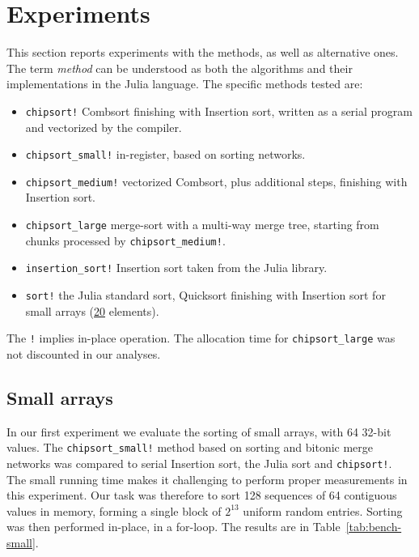 \documentclass{juliacon}
\begin{document}
\section{Experiments}
\label{sec:experiments}
%
This section reports experiments with the \chipsort methods, as well as alternative ones. The term {\it method} can be understood as both the algorithms and their implementations in the Julia language. The specific methods tested are:
\begin{itemize}
\item {\tt chipsort!} Combsort finishing with Insertion sort, written as a serial program and vectorized by the compiler.
\item {\tt chipsort\_small!} in-register, based on sorting networks.
\item {\tt chipsort\_medium!} vectorized Combsort, plus additional steps, finishing with Insertion sort.
\item {\tt chipsort\_large} merge-sort with a multi-way merge tree, starting from chunks processed by {\tt chipsort\_medium!}.
\item {\tt insertion\_sort!} Insertion sort taken from the Julia library.
\item {\tt sort!} the Julia standard sort, Quicksort finishing with Insertion sort for small arrays (\href{https://github.com/JuliaLang/julia/blob/de3401908a506727ed70b3e953bd721ab4d66109/base/sort.jl#L461}{20} elements).
\end{itemize}

The {\tt !} implies in-place operation. The allocation time for {\tt chipsort\_large} was not discounted in our analyses.

\subsection{Small arrays}
In our first experiment we evaluate the sorting of small arrays, with 64 32-bit values. The {\tt chipsort\_small!} method based on sorting and bitonic merge networks was compared to serial Insertion sort, the Julia sort and {\tt chipsort!}. The small running time makes it challenging to perform proper measurements in this experiment. Our task was therefore to sort 128 sequences of 64 contiguous values in memory, forming a single block of $2^{13}$ uniform random entries. Sorting was then performed in-place, in a for-loop. The results are in Table~\ref{tab:bench-small}.

\begin{table}[h]
\label{tab:bench-small}
\end{table}
\end{document}
